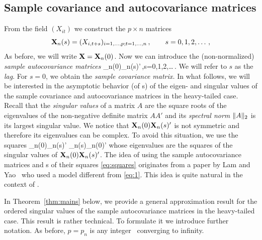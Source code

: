 \subsection{Sample covariance and autocovariance matrices}
From the field $(X_{it})$ we construct the $p\times n$ matrices
\begin{equation}\label{eq:26}
{\mathbf X}_n(s)= (X_{i,t+s})_{i=1,\ldots,p;t=1,\ldots,n}\,,\qquad s=0,1,2,\ldots\,,
\end{equation}
As before, we will write ${\mathbf X}={\mathbf X}_n(0)$.
Now we can introduce the (non-normalized)
{\em sample autocovariance matrices}
\beam\label{eq:sample}
\X_n(0)\X_n(s)'\,,\qquad s=0,1,2,\ldots\,.
\eeam
We will refer to $s$ as the {\em lag}. For $s=0$, we obtain the {\em sample covariance matrix.}
In what follows, we will be interested in the asymptotic behavior (of \fct s) of the eigen- and singular values of the
sample covariance and autocovariance matrices in the heavy-tailed case. Recall that the {\em singular values} of a matrix $A$ are the square roots of the
eigenvalues of the non-negative definite matrix $AA'$ and its {\em spectral norm} $\|A\|_2$ is its largest singular value. We notice that ${\mathbf X}_n(0){\mathbf X}_n(s)'$ is not symmetric
and therefore its eigenvalues can be complex. To avoid this situation, we use
the squares
\beam\label{eq:squares}
\X_n(0)\X_n(s)' \X_n(s)\X_n(0)'
\eeam
whose eigenvalues are the squares of the singular values of ${\mathbf X}_n(0){\mathbf X}_n(s)'$.
The idea of using the sample autocovariance matrices and \fct s of their squares \eqref{eq:squares}
originates from a paper by Lam and Yao~\cite{lam:yao} who used a model different from \eqref{eq:1}.
This idea is quite natural in the context of \tsa .
\par
In Theorem~\ref{thm:mains} below, we provide a general approximation result for the ordered singular values of the sample
autocovariance matrices in the heavy-tailed case. This result is rather technical. To formulate it we introduce further notation.
As before, $p=p_n$ is any integer \seq\ converging to infinity.
